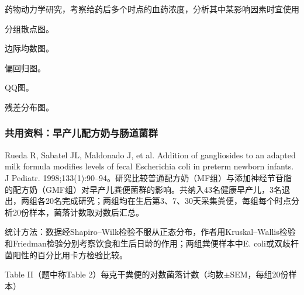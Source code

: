 \par\addvspace{6pt}\noindent\begin{minipage}{\linewidth}


药物动力学研究，考察给药后多个时点的血药浓度，分析其中某影响因素时宜使用


\begin{choices}

\item 分组散点图。

\item 边际均数图。

\item 偏回归图。

\item QQ图。

\item 残差分布图。

\end{choices}

\end{minipage}\par\vspace{4pt}

\subsubsection*{共用资料：早产儿配方奶与肠道菌群}

Rueda R, Sabatel JL, Maldonado J, et al. Addition of gangliosides to an adapted milk formula modifies levels of fecal Escherichia coli in preterm newborn infants. J Pediatr. 1998;133(1):90--94。研究比较普通配方奶（MF组）与添加神经节苷脂的配方奶（GMF组）对早产儿粪便菌群的影响。共纳入43名健康早产儿，3名退出，两组各20名完成研究；两组均在生后第3、7、30天采集粪便，每组每个时点分析20份样本，菌落计数取对数后汇总。

统计方法：数据经Shapiro--Wilk检验不服从正态分布，作者用Kruskal--Wallis检验和Friedman检验分别考察饮食和生后日龄的作用；两组粪便样本中E. coli或双歧杆菌阳性的百分比用卡方检验比较。

Table II（题中称Table 2）\quad 每克干粪便的对数菌落计数（均数\(\pm\)SEM，每组20份样本）

